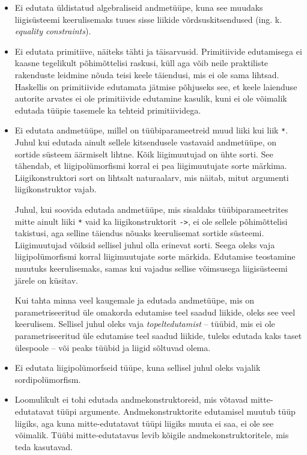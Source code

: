 \documentclass[12pt]{article}
\begin{document}
        \begin{itemize}
          \item
            Ei edutata üldistatud algebraliseid andmetüüpe, kuna see muudaks liigisüsteemi keerulisemaks tuues sisse liikide võrdsuskitsendused (ing. k. \textit{equality constraints}).
          \item
            Ei edutata primitiive, näiteks tähti ja täisarvusid. Primitiivide edutamisega ei kaasne tegelikult põhimõttelisi raskusi, küll aga võib neile praktiliste rakenduste leidmine nõuda teisi keele täiendusi, mis ei ole sama lihtsad. Haskellis on primitiivide edutamata jätmise põhjuseks see, et keele laienduse autorite arvates ei ole primitiivide edutamine kasulik, kuni ei ole võimalik edutada tüüpie tasemele ka tehteid primitiividega.
          \item
            Ei edutata andmetüüpe, millel on tüübiparameetreid muud liiki kui liik \verb!*!. Juhul kui edutada ainult sellele kitsendusele vastavaid andmetüüpe, on sortide süsteem äärmiselt lihtne. Kõik liigimuutujad on ühte sorti. See tähendab, et liigipolümorfismi korral ei pea liigimuutujate sorte märkima. Liigikonstruktori sort on lihtsalt naturaalarv, mis näitab, mitut argumenti liigikonstruktor vajab.

            Juhul, kui soovida edutada andmetüüpe, mis sisaldaks tüübiparameetrites mitte ainult liiki \verb!*! vaid ka liigikonstruktorit \verb!->!, ei ole sellele põhimõttelisi takistusi, aga selline täiendus nõuaks keerulisemat sortide süsteemi. Liigimuutujad võiksid sellisel juhul olla erinevat sorti. Seega oleks vaja liigipolümorfismi korral liigimuutujate sorte märkida. Edutamise teostamine muutuks keerulisemaks, samas kui vajadus sellise võimsusega liigisüsteemi järele on küsitav.

            Kui tahta minna veel kaugemale ja edutada andmetüüpe, mis on parametriseeritud üle omakorda edutamise teel saadud liikide, oleks see veel keerulisem. Sellisel juhul oleks vaja \textit{topeltedutamist} -- tüübid, mis ei ole parametriseeritud üle edutamise teel saadud liikide, tuleks edutada kaks taset ülespoole -- või peaks tüübid ja liigid sõltuvad olema.
          \item
            Ei edutata liigipolümorfseid tüüpe, kuna sellisel juhul oleks vajalik sordipolümorfism.
          \item
            Loomulikult ei tohi edutada andmekonstruktoreid, mis võtavad mitte-edutatavat tüüpi argumente. Andmekonstruktorite edutamisel muutub tüüp liigiks, aga kuna mitte-edutatavat tüüpi liigiks muuta ei saa, ei ole see võimalik. Tüübi mitte-edutatavus levib kõigile andmekonstruktoritele, mis teda kasutavad.
        \end{itemize}
\end{document}
